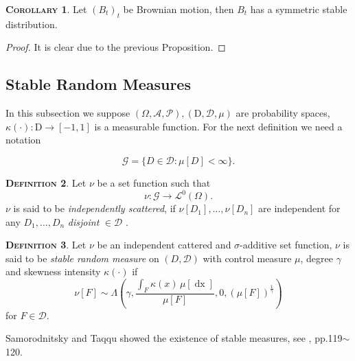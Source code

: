 \documentclass[a4paper, twoside, 11pt]{article}
\theoremstyle{definition}
\newtheorem{definition}{\scshape Definition}[section]
\newtheorem{corollary}[definition]{\scshape Corollary}
\newcommand{\brkt}[1]{\left({#1} \right)}
\begin{document}
\begin{corollary}
  Let $(B_t)_t$ be Brownian motion, then $B_t$ has a symmetric stable distribution.
\end{corollary}
\begin{proof}
  It is clear due to the previous Proposition.
\end{proof}

\subsection{Stable Random Measures}
In this subsection we suppose $(\Omega, \mathscr{A}, \mathcal{P}), (\mathrm{D}, \mathscr{D}, \mu)$  are probability spaces, $\kappa(\cdot) : \mathrm{D} \rightarrow [-1, 1]$ is a measurable function. For the next definition we need a notation

\begin{equation}
  \mathscr{G} = \{D \in \mathscr{D} : \mu[D] < \infty\}.
\end{equation}

\begin{definition}
	Let $\nu$ be a set function such that
	\begin{equation}
	  \nu : \mathscr{G} \rightarrow \mathcal{L}^0(\Omega).\nonumber
	\end{equation}
	$\nu$ is said to be \emph{independently scattered}, if $\nu[D_1], \dots, \nu[D_n]$ are independent for any $D_1,\dots, D_n$ \emph{disjoint} $\in \mathscr{D}$ .
\end{definition}


\begin{definition}
  Let $\nu$ be an independent cattered and $\sigma$-additive set function,
$\nu$ is said to be \emph{stable random measure} on $(D, \mathscr{D})$ with control measure $\mu$, degree $\gamma$ and skewness intensity $\kappa(\cdot)$ if 
\begin{equation}
  \nu[F] \sim \Lambda\brkt{\gamma, \frac{\int_F \kappa(x)\, \mu[\mathop{dx}]}{\mu[F]}, 0, (\mu[F])^{\frac{1}{\gamma}}}
\end{equation}
for $F \in \mathscr{D}$.
\end{definition}
Samorodnitsky and Taqqu showed the existence of stable measures, see \cite{samorodnitsky}, pp.119$\sim$120.
\end{document}
